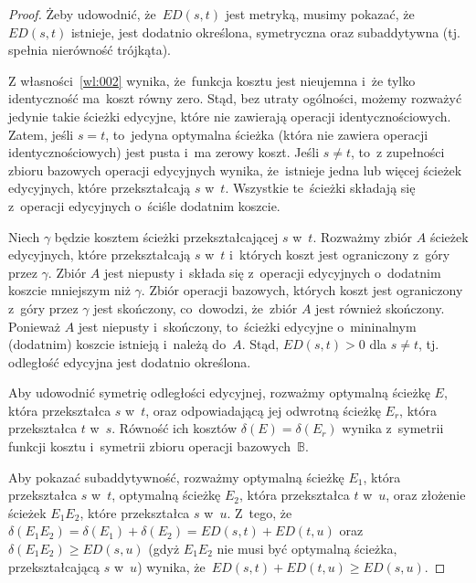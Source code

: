 \documentclass{praca1}
\begin{document}
\begin{proof}
Żeby udowodnić, że~$ED(s,t)$ jest metryką, musimy pokazać, że~$ED(s,t)$ istnieje, 	jest dodatnio określona, symetryczna oraz subaddytywna (tj. spełnia nierówność trójkąta).

Z własności~\ref{wl:002} wynika, że~funkcja kosztu jest nieujemna i~że tylko identyczność ma~koszt równy zero. Stąd, bez utraty ogólności, możemy rozważyć jedynie takie ścieżki edycyjne, które nie zawierają operacji identycznościowych. Zatem, jeśli $s=t$, to~jedyna optymalna ścieżka (która nie zawiera operacji identycznościowych) jest pusta i~ma zerowy koszt. Jeśli $s\neq t$, to~z zupełności zbioru bazowych operacji edycyjnych wynika, że~istnieje jedna lub więcej ścieżek edycyjnych, które przekształcają $s$ w~$t$. Wszystkie te~ścieżki składają się z~operacji edycyjnych o~ściśle dodatnim koszcie.

Niech $\gamma$ będzie kosztem ścieżki przekształcającej $s$ w~$t$. Rozważmy zbiór $A$ ścieżek edycyjnych, które przekształcają $s$ w~$t$ i~których koszt jest ograniczony z~góry przez $\gamma$. Zbiór $A$ jest niepusty i~składa się z~operacji edycyjnych o~dodatnim koszcie mniejszym niż $\gamma$. Zbiór operacji bazowych, których koszt jest ograniczony z~góry przez $\gamma$ jest skończony, co~dowodzi, że~zbiór $A$ jest również skończony. Ponieważ $A$ jest niepusty i~skończony, to~ścieżki edycyjne o~mininalnym (dodatnim) koszcie istnieją i~należą do~$A$. Stąd, $ED(s,t) > 0$ dla $s\neq t$, tj. odległość edycyjna jest dodatnio określona.

Aby udowodnić symetrię odległości edycyjnej, rozważmy optymalną ścieżkę $E$, która przekształca $s$ w~$t$, oraz odpowiadającą jej odwrotną ścieżkę $E_r$, która przekształca $t$ w~$s$. Równość ich kosztów $\delta(E) = \delta(E_r)$ wynika z~symetrii funkcji kosztu i~symetrii zbioru operacji bazowych~$\mathbb{B}$. 

Aby pokazać subaddytywność, rozważmy optymalną ścieżkę $E_1$, która przekształca $s$ w~$t$, optymalną ścieżkę $E_2$, która przekształca $t$ w~$u$, oraz złożenie ścieżek $E_1E_2$, które przekształca $s$ w~$u$. Z~tego, że~$\delta(E_1E_2) = \delta(E_1) + \delta(E_2) = ED(s,t)+ED(t,u)$ oraz $\delta(E_1E_2) \geq ED(s,u)$ (gdyż $E_1 E_2$ nie musi być optymalną ścieżka, przekształcającą $s$ w~$u$) wynika, że~$ED(s,t)+ED(t,u) \geq ED(s,u)$.
\end{proof}
\end{document}
